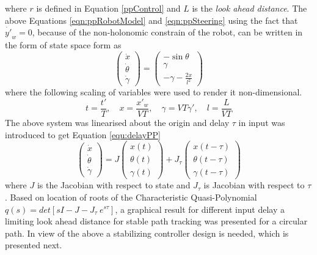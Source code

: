  where $r$ is defined in Equation \ref{ppControl} and $L$ is the \textit{look ahead distance}. The above Equations \ref{eqn:ppRobotModel} and \ref{eqn:ppSteering}  using the fact that $\dot{y'}_w=0$, because of the non-holonomic constrain of the robot, can be written  in the form of state space  form  as 
\begin{equation}
	\begin{pmatrix}
	\dot{x}\\\dot{\theta}\\\dot{\gamma}
	\end{pmatrix}
	=
	\begin{pmatrix}
	-\sin\theta\\ \gamma \\ -\gamma -\frac{2x}{l^2}
	\end{pmatrix}
\end{equation}
where the following scaling of variables were used to render it non-dimensional. 
\begin{equation*}
	t=\frac{t'}{T}, \quad x=\frac{x'_w}{VT}, \quad \gamma=VT\gamma',\quad l=\frac{L}{VT}
\end{equation*}
The above system was linearised about the origin and  delay $\tau$ in  input was introduced  to get Equation \ref{equ:delayPP}
 \begin{equation}
 \label{eqn:delayPP}
 \begin{pmatrix}
 \dot{x}\\\dot{\theta}\\\dot{\gamma}
 \end{pmatrix}
 =J
 \begin{pmatrix}
 x(t)\\\theta(t)\\\gamma(t)
 \end{pmatrix}+
 J_\tau 
  \begin{pmatrix}
 x(t-\tau)\\\theta(t-\tau)\\\gamma(t-\tau)
 \end{pmatrix}
 \end{equation}
 where $J$ is the Jacobian with respect to state and $J_\tau$ is Jacobian with respect to $\tau$. 
 Based on location of roots of the Characteristic Quasi-Polynomial $q(s)=det[sI-J-J_\tau~ e^{s\tau} ] $, a graphical result for different input delay a limiting  look ahead distance for stable path tracking was presented for a  circular path. In view of the above a stabilizing controller design is needed, which is presented next.
